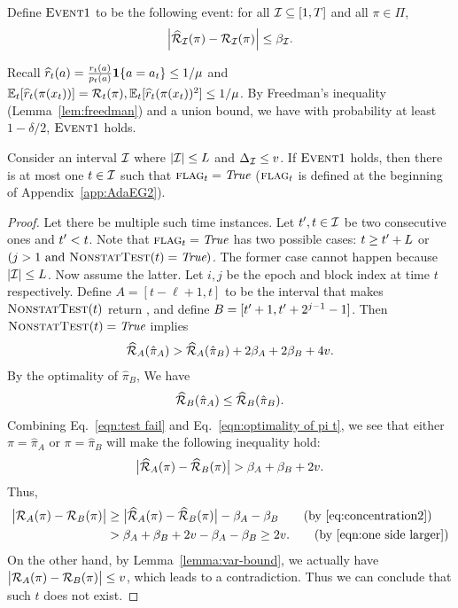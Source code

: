 \begin{definition}[$\evt 1$]
Define $\evt 1$ to be the following event: for all ${\mathcal{I}}\subseteq [1,T]$ and all $\pi\in\Pi$, 
\begin{align}
\left\vert \widehat{\cal{R}}_{{\mathcal{I}}}(\pi)-{\mathcal{R}}_{{\mathcal{I}}}(\pi) \right\vert \leq \beta_{\mathcal{I}}. \label{eq:concentration2} 
\end{align}
\end{definition}
Recall $\widehat{r}_t(a) = \frac{r_t(a)}{p_t(a)} \boldsymbol{1}\{a = a_t\} \leq 1/\mu$ and
$\mathbb{E}_t[\widehat{r}_t(\pi(x_t))] = {\mathcal{R}}_t(\pi),  \mathbb{E}_t[\widehat{r}_t(\pi(x_t))^2] \leq 1/\mu$.
By Freedman's inequality (Lemma~\ref{lem:freedman}) and a union bound, 
we have with probability at least $1-\delta/2$, $\evt 1$ holds. 

\begin{lemma}
\label{lemma:at most one rerun}
Consider an interval ${\mathcal{I}}$ where $\lvert{\mathcal{I}}\rvert\leq L$ and $\Delta_{\mathcal{I}} \leq v$. If $\evt 1$ holds, then there is at most one $t\in {\mathcal{I}}$ such that $\textsc{flag}_t=\textit{True}$ ($\textsc{flag}_t$ is defined at the beginning of Appendix~\ref{app:AdaEG2}).
\end{lemma}
\begin{proof}
Let there be multiple such time instances. Let $t^\prime, t\in {\mathcal{I}}$ be two consecutive ones and $t^\prime<t$. 
Note that $\textsc{flag}_t=\textit{True}$ has two possible cases: $t\geq t^\prime+L$ or $(j>1 \text{ and }\textsc{NonstatTest}(t)=\textit{True})$. 
The former case cannot happen because $\lvert{\mathcal{I}}\rvert\leq L$. Now assume the latter. Let $i,j$ be the epoch and block index at time $t$ respectively. Define $A=[t-\ell+1,t]$ to be the interval that makes $\textsc{NonstatTest}(t)$ return \true, and define $B=[t^\prime+1, t^\prime+2^{j-1}-1]$. Then $\textsc{NonstatTest}(t)=\textit{True}$ implies 
\begin{align}
\widehat{\cal{R}}_{A}(\hat{\pi}_{A}) > \widehat{\cal{R}}_{A}(\hat{\pi}_B) + 2\beta_{A} + 2\beta_{B} + 4v. \label{eqn:test fail}
\end{align}
By the optimality of $\hat{\pi}_B$, We have 
\begin{align}
\widehat{\cal{R}}_{B}(\hat{\pi}_{A}) \leq \widehat{\cal{R}}_{B}(\hat{\pi}_B). \label{eqn:optimality of pi t}
\end{align}
Combining Eq.~\eqref{eqn:test fail} and Eq.~\eqref{eqn:optimality of pi t}, we see that either $\pi=\hat{\pi}_{A}$ or $\pi=\hat{\pi}_{B}$ will make the following inequality hold: 
\begin{align}
\big\lvert\widehat{\cal{R}}_{A}(\pi)-\widehat{\cal{R}}_{B}(\pi)\big\rvert > \beta_{A} +\beta_{B} + 2v. \label{eqn:one side larger}
\end{align}
Thus, 
\begin{align*}
\bigabs{\calR_{A}(\pi)-\calR_{B}(\pi)}&\geq \bigabs{\avgR_{A}(\pi) - \avgR_{B}(\pi)} - \beta_{A} - \beta_{B}  \tag{by \eqref{eq:concentration2}} \\
& > \beta_{A} + \beta_{B} + 2v - \beta_{A}- \beta_{B} \geq 2v. \tag{by \eqref{eqn:one side larger}}
\end{align*}
On the other hand, by Lemma~\ref{lemma:var-bound}, we actually have $\big\lvert{\mathcal{R}}_{A}(\pi)-{\mathcal{R}}_{B}(\pi)\big\rvert \leq v$, which leads to a contradiction. Thus we can conclude that such $t$ does not exist. 

\end{proof}

